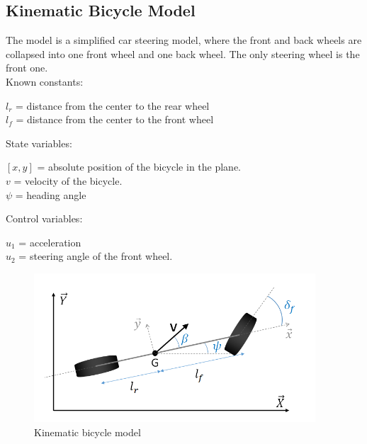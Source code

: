 \documentclass[12pt]{article}
\begin{document}
\subsection{Kinematic Bicycle Model \cite{kbm}}
The model is a simplified car steering model, where the front and back wheels are collapsed into one front wheel and one back wheel. The only steering wheel is the front one. \\
\smallskip
Known constants:
\begin{center}
\( l_r \) = distance from the center to the rear wheel \\
\( l_f \) = distance from the center to the front wheel \\
\end{center}
State variables:
\begin{center}
\( [x, y] \) = absolute position of the bicycle in the plane. \\
\( v \) = velocity of the bicycle. \\
\( \psi \) = heading angle \\
\end{center}
Control variables:
\begin{center}
\( u_1 \) = acceleration \\
\( u_2 \) = steering angle of the front wheel. \\
\end{center}
\begin{figure}[!h]
\includegraphics[width=\textwidth]{bike}
\caption{Kinematic bicycle model}
\end{figure}
\smallskip

\clearpage
\end{document}
